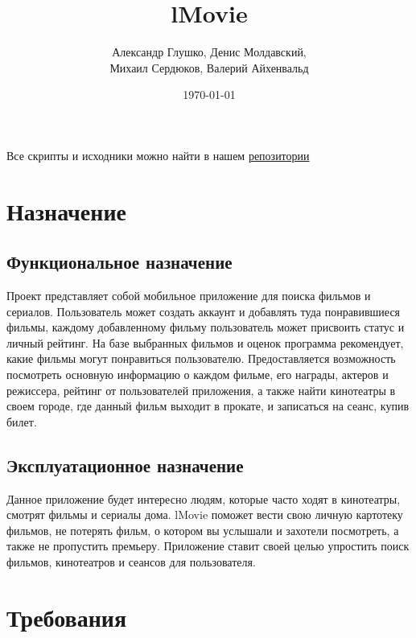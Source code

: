 \documentclass[a4paper,16pt]{article}
\title{lMovie}
\author{Александр Глушко, Денис Молдавский, \\ Михаил Сердюков, Валерий Айхенвальд}
\date{\today}
\begin{document}
\maketitle
\tableofcontents
\vspace{50mm}
Все скрипты и исходники можно найти в нашем  \href{https://github.com/Badcat330/lMovie}{репозитории} 
\newpage

\section{Назначение}
\subsection{Функциональное назначение}
Проект представляет собой мобильное приложение для поиска фильмов и сериалов. Пользователь может создать аккаунт и добавлять туда понравившиеся фильмы, каждому добавленному фильму пользователь может присвоить статус и личный рейтинг. На базе выбранных фильмов и оценок программа рекомендует, какие фильмы могут понравиться пользователю. Предоставляется  возможность посмотреть основную информацию о каждом фильме, его награды, актеров и режиссера, рейтинг от пользователей приложения, а также найти кинотеатры в своем городе, где данный фильм выходит в прокате, и записаться на сеанс, купив билет.
\subsection{Эксплуатационное назначение}
Данное приложение будет интересно людям, которые часто ходят в кинотеатры, смотрят фильмы и сериалы дома. lMovie поможет вести свою личную картотеку фильмов, не потерять фильм, о котором вы услышали и захотели посмотреть, а также не пропустить премьеру. Приложение ставит своей целью упростить поиск фильмов, кинотеатров и сеансов для пользователя. 


\section{Требования}
\end{document}
